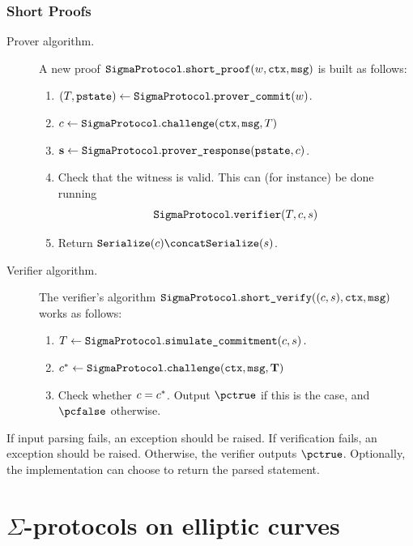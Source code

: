 \documentclass[11pt]{article}
\begin{document}
\subsubsection{Short Proofs}
\begin{description}
\item[Prover algorithm.]
A new proof $\texttt{SigmaProtocol}.\texttt{short\_proof}(w,\texttt{ctx}, \texttt{msg})$ is built as follows:
\begin{enumerate}
  \item
     $(T,\texttt{pstate})\gets\texttt{SigmaProtocol}.\texttt{prover\_commit}(w)$.
  \item
   $c \gets \texttt{SigmaProtocol}.\texttt{challenge}(\texttt{ctx}, \texttt{msg},  T)$
  \item
     $\mathbf {s}\gets\texttt{SigmaProtocol}.\texttt{prover\_response}(\texttt{pstate},c)$.
    \item Check that the witness is valid. This can (for instance) be done running \[\texttt{SigmaProtocol}.\texttt{verifier}(T, c, s)\]
  \item
  Return $\serialize(\challenge) \concat \serialize(\response)$.
\end{enumerate}
\item[Verifier algorithm.] The verifier's algorithm $\texttt{SigmaProtocol}.\texttt{short\_verify}( (c, s), \texttt{ctx}, \texttt{msg})$ works as follows:
\begin{enumerate}
  \item $T \gets \texttt{SigmaProtocol}.\texttt{simulate\_commitment}(c, s)\,.$
  \item $c^* \gets \texttt{SigmaProtocol}.\texttt{challenge}(\texttt{ctx}, \texttt{msg}, \mathbf {T})$
  \item
  Check whether $c=c^*$.
  Output $\accept$ if this is the case, and $\reject$ otherwise.
\end{enumerate}
\end{description}

If input parsing fails, an exception should be raised.
If verification fails, an exception should be raised.
Otherwise, the verifier outputs $\pctrue$. Optionally, the implementation can choose to return the parsed statement.





\section{$\Sigma$-protocols on elliptic curves}
\label{sec:instantiation}
\end{document}
